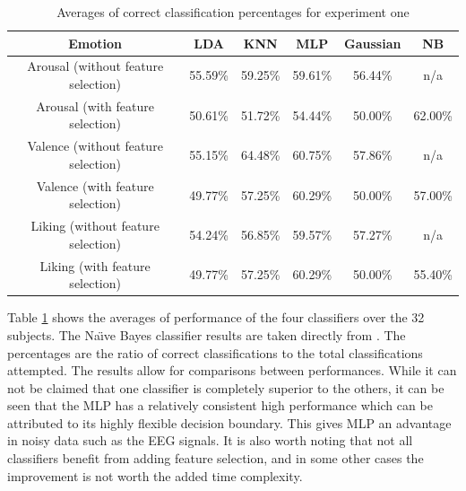 \documentclass[12pt, a4paper, fleqn]{memoir}%
\begin{document}
\begin{table}[h]
	\begin{tabular}{| c | c | c | c | c | c |}
		\hline \hline
		Emotion					& LDA	  & KNN	    & MLP     & Gaussian & NB      \\
		\hline \hline
		Arousal (without feature selection)	& 55.59\% & 59.25\% & 59.61\% & 56.44\%  & n/a     \\ \hline
		Arousal (with feature selection)        & 50.61\% & 51.72\% & 54.44\% & 50.00\%  & 62.00\% \\ \hline
		\hline
		Valence (without feature selection)     & 55.15\% & 64.48\% & 60.75\% & 57.86\%  & n/a     \\ \hline
		Valence (with feature selection)	& 49.77\% & 57.25\% & 60.29\% & 50.00\%	 & 57.00\% \\ \hline
		\hline
		Liking  (without feature selection)	& 54.24\% & 56.85\% & 59.57\% & 57.27\%  & n/a     \\ \hline
		Liking  (with feature selection)	& 49.77\% & 57.25\% & 60.29\% & 50.00\%  & 55.40\% \\ \hline
		\hline
	\end{tabular}
	\caption{Averages of correct classification percentages for experiment one}
	\label{table:exp1}
\end{table}

Table \ref{table:exp1} shows the averages of performance of the four classifiers over the 32 subjects. The Na\"{\i}ve Bayes classifier results are taken directly from \cite{koelstra2012deap}. The percentages are the ratio of correct classifications to the total classifications attempted. The results allow for comparisons between performances. While it can not be claimed that one classifier is completely superior to the others, it can be seen that the MLP has a relatively consistent high performance which can be attributed to its highly flexible decision boundary. This gives MLP an advantage in noisy data such as the EEG signals. It is also worth noting that not all classifiers benefit from adding feature selection, and in some other cases the improvement is not worth the added time complexity.
\end{document}
